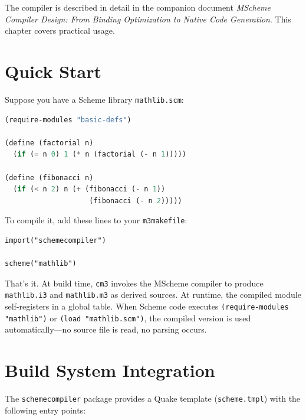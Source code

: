 \documentclass[12pt]{report}
\begin{document}
The compiler is described in detail in the companion document
\emph{MScheme Compiler Design: From Binding Optimization to
Native Code Generation}.  This chapter covers practical usage.

\section{Quick Start}

Suppose you have a Scheme library \texttt{mathlib.scm}:

\begin{lstlisting}[language=Scheme]
(require-modules "basic-defs")

(define (factorial n)
  (if (= n 0) 1 (* n (factorial (- n 1)))))

(define (fibonacci n)
  (if (< n 2) n (+ (fibonacci (- n 1))
                    (fibonacci (- n 2)))))
\end{lstlisting}

To compile it, add these lines to your \texttt{m3makefile}:

\begin{lstlisting}[language={}]
import("schemecompiler")

scheme("mathlib")
\end{lstlisting}

That's it.  At build time, \texttt{cm3} invokes the MScheme compiler
to produce \texttt{mathlib.i3} and \texttt{mathlib.m3} as derived
sources.  At runtime, the compiled module self-registers in a global
table.  When Scheme code executes
\texttt{(require-modules "mathlib")} or \texttt{(load "mathlib.scm")},
the compiled version is used automatically---no source file is read,
no parsing occurs.

\section{Build System Integration}

The \texttt{schemecompiler} package provides a Quake template
(\texttt{scheme.tmpl}) with the following entry points:
\end{document}
